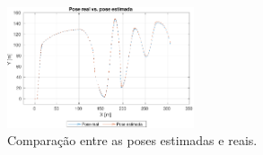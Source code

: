 \documentclass[twocolumn]{article}
\begin{document}
\begin{figure}[ht]
    \centering
    \includegraphics[width=0.49\textwidth]{figs/pose_compare.pdf}
    \caption{Comparação entre as poses estimadas e reais.}
    \label{fig:ekf_real_compare}
\end{figure}


     
     
     
     
\end{document}
